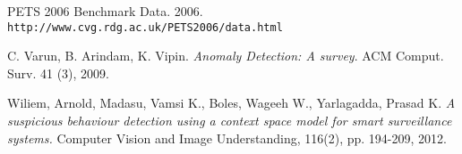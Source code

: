 \begin{thebibliography}{20}
PETS 2006 Benchmark Data. 2006.
\\\texttt{http://www.cvg.rdg.ac.uk/PETS2006/data.html}

C. Varun, B. Arindam, K. Vipin.
\textit{Anomaly Detection: A survey}. 
ACM Comput. Surv. 41 (3), 2009.

Wiliem, Arnold, Madasu, Vamsi K., Boles, Wageeh W., Yarlagadda, Prasad K.
\textit{A suspicious behaviour detection using a context space model for smart surveillance systems.} 
Computer Vision and Image Understanding, 116(2), pp. 194-209, 2012.
 


\end{thebibliography}
